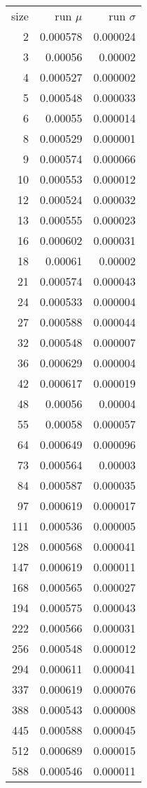 \begin{longtable}{r r r}
size & run $\mu$ & run $\sigma$ \\
2 & 0.000578 & 0.000024 \\
3 & 0.00056 & 0.00002 \\
4 & 0.000527 & 0.000002 \\
5 & 0.000548 & 0.000033 \\
6 & 0.00055 & 0.000014 \\
8 & 0.000529 & 0.000001 \\
9 & 0.000574 & 0.000066 \\
10 & 0.000553 & 0.000012 \\
12 & 0.000524 & 0.000032 \\
13 & 0.000555 & 0.000023 \\
16 & 0.000602 & 0.000031 \\
18 & 0.00061 & 0.00002 \\
21 & 0.000574 & 0.000043 \\
24 & 0.000533 & 0.000004 \\
27 & 0.000588 & 0.000044 \\
32 & 0.000548 & 0.000007 \\
36 & 0.000629 & 0.000004 \\
42 & 0.000617 & 0.000019 \\
48 & 0.00056 & 0.00004 \\
55 & 0.00058 & 0.000057 \\
64 & 0.000649 & 0.000096 \\
73 & 0.000564 & 0.00003 \\
84 & 0.000587 & 0.000035 \\
97 & 0.000619 & 0.000017 \\
111 & 0.000536 & 0.000005 \\
128 & 0.000568 & 0.000041 \\
147 & 0.000619 & 0.000011 \\
168 & 0.000565 & 0.000027 \\
194 & 0.000575 & 0.000043 \\
222 & 0.000566 & 0.000031 \\
256 & 0.000548 & 0.000012 \\
294 & 0.000611 & 0.000041 \\
337 & 0.000619 & 0.000076 \\
388 & 0.000543 & 0.000008 \\
445 & 0.000588 & 0.000045 \\
512 & 0.000689 & 0.000015 \\
588 & 0.000546 & 0.000011 \\

\end{longtable}
